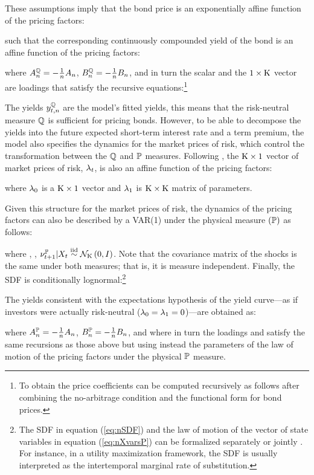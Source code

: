 {These assumptions imply that the bond price is an exponentially affine function of the pricing factors:
	
such that the corresponding continuously compounded yield of the bond is an affine function of the pricing factors:
	
\noindent where \(A_{n}^{\mathbb{Q}} = - \frac{1}{n} A_{n}\), \(B_{n}^{\mathbb{Q}} = - \frac{1}{n} B_{n}\), and in turn the scalar  and the \(1 \times \mathrm{K}\) vector  are loadings that satisfy the recursive equations:\footnote{ To obtain the price coefficients can be computed recursively as follows after combining the no-arbitrage condition and the functional form for bond prices.}
	
	\vspace{-.7cm}
	
The yields \(y_{t,n}^{\mathbb{Q}}\) are the model's fitted yields, this means that the risk-neutral measure \(\mathbb{Q}\) is sufficient for pricing bonds. However, to 
be able to decompose the yields into the future expected short-term interest rate and a term premium, the model also specifies the dynamics for the market prices of risk, which control the transformation between the \(\mathbb{Q}\) and \(\mathbb{P}\) measures. Following \cite{Duffee:2002}, the \(\mathrm{K} \times 1\) vector of market prices of risk, \(\lambda_{t}\), is also an affine function of the pricing factors:
	
\noindent where \(\lambda_{0}\) is a \(\mathrm{K} \times 1\) vector and \(\lambda_{1}\) is \(\mathrm{K} \times \mathrm{K}\) matrix of parameters.

Given this structure for the market prices of risk, the dynamics of the pricing factors can also be described by a VAR(1) under the physical measure $(\mathbb{P})$ as follows:
	
\noindent where , ,  \(\nu_{t+1}^{\mathbb{P}} | X_{t} \overset{\text{iid}}{\sim} \mathcal{N}_{\mathrm{K}} \left(0,I\right)\). Note that the covariance matrix of the shocks is the same under both measures; that is, it is measure independent. Finally, the SDF is conditionally lognormal:\footnote{ The SDF in equation (\ref{eq:nSDF}) and the law of motion of the vector of state variables in equation (\ref{eq:nXvarsP}) can be formalized separately or jointly \citep[see][]{GurkaynakWright:2012}. For instance, in a utility maximization framework, the SDF is usually interpreted as the intertemporal marginal rate of substitution.}
	
The yields consistent with the expectations hypothesis of the yield curve---as if investors were actually risk-neutral (\(\lambda_{0} = \lambda_{1} = 0\))---are obtained as:
	
\noindent where \(A_{n}^{\mathbb{P}} = - \frac{1}{n} A_{n}\), \(B_{n}^{\mathbb{P}} = - \frac{1}{n} B_{n}\), and where in turn the loadings  and  satisfy the same recursions as those above but using instead the parameters of the law of motion of the pricing factors under the physical \(\mathbb{P}\) measure.

}
